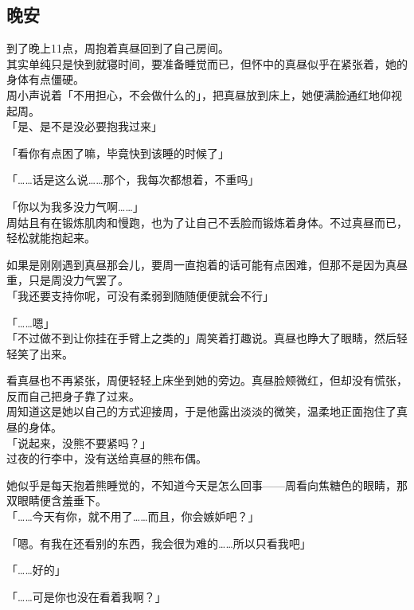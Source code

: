 \subsection{晚安}

到了晚上11点，周抱着真昼回到了自己房间。\\

其实单纯只是快到就寝时间，要准备睡觉而已，但怀中的真昼似乎在紧张着，她的身体有点僵硬。\\

周小声说着「不用担心，不会做什么的」，把真昼放到床上，她便满脸通红地仰视起周。\\

「是、是不是没必要抱我过来」

「看你有点困了嘛，毕竟快到该睡的时候了」

「……话是这么说……那个，我每次都想着，不重吗」

「你以为我多没力气啊……」\\

周姑且有在锻炼肌肉和慢跑，也为了让自己不丢脸而锻炼着身体。不过真昼而已，轻松就能抱起来。

如果是刚刚遇到真昼那会儿，要周一直抱着的话可能有点困难，但那不是因为真昼重，只是周没力气罢了。\\

「我还要支持你呢，可没有柔弱到随随便便就会不行」

「……嗯」\\

「不过做不到让你挂在手臂上之类的」周笑着打趣说。真昼也睁大了眼睛，然后轻轻笑了出来。

看真昼也不再紧张，周便轻轻上床坐到她的旁边。真昼脸颊微红，但却没有慌张，反而自己把身子靠了过来。\\

周知道这是她以自己的方式迎接周，于是他露出淡淡的微笑，温柔地正面抱住了真昼的身体。\\

「说起来，没熊不要紧吗？」\\

过夜的行李中，没有送给真昼的熊布偶。

她似乎是每天抱着熊睡觉的，不知道今天是怎么回事——周看向焦糖色的眼睛，那双眼睛便含羞垂下。\\

「……今天有你，就不用了……而且，你会嫉妒吧？」

「嗯。有我在还看别的东西，我会很为难的……所以只看我吧」

「……好的」

「……可是你也没在看着我啊？」\\

